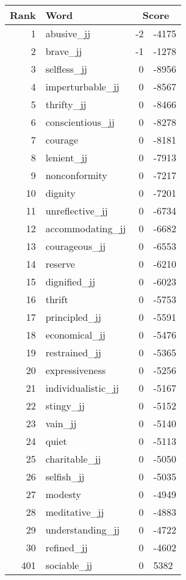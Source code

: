 \begin{longtable}[!htbp]{| rlr@{.}l |}
    \hline
    \textbf{Rank} & \textbf{Word} & \multicolumn{2}{c|}{\textbf{Score}} \\
    \hline
    \endhead
    1 & abusive\_jj & -2 & -4175 \\
    2 & brave\_jj & -1 & -1278 \\
    3 & selfless\_jj & 0 & -8956 \\
    4 & imperturbable\_jj & 0 & -8567 \\
    5 & thrifty\_jj & 0 & -8466 \\
    6 & conscientious\_jj & 0 & -8278 \\
    7 & courage & 0 & -8181 \\
    8 & lenient\_jj & 0 & -7913 \\
    9 & nonconformity & 0 & -7217 \\
    10 & dignity & 0 & -7201 \\
    11 & unreflective\_jj & 0 & -6734 \\
    12 & accommodating\_jj & 0 & -6682 \\
    13 & courageous\_jj & 0 & -6553 \\
    14 & reserve & 0 & -6210 \\
    15 & dignified\_jj & 0 & -6023 \\
    16 & thrift & 0 & -5753 \\
    17 & principled\_jj & 0 & -5591 \\
    18 & economical\_jj & 0 & -5476 \\
    19 & restrained\_jj & 0 & -5365 \\
    20 & expressiveness & 0 & -5256 \\
    21 & individualistic\_jj & 0 & -5167 \\
    22 & stingy\_jj & 0 & -5152 \\
    23 & vain\_jj & 0 & -5140 \\
    24 & quiet & 0 & -5113 \\
    25 & charitable\_jj & 0 & -5050 \\
    26 & selfish\_jj & 0 & -5035 \\
    27 & modesty & 0 & -4949 \\
    28 & meditative\_jj & 0 & -4883 \\
    29 & understanding\_jj & 0 & -4722 \\
    30 & refined\_jj & 0 & -4602 \\
    401 & sociable\_jj & 0 & 5382 \\

\end{longtable}
